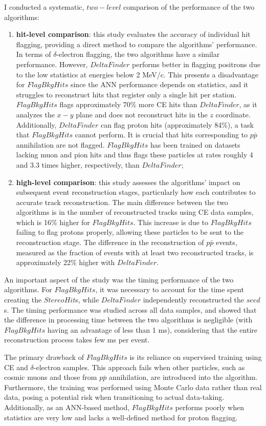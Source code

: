 I conducted a systematic, $two-level$ comparison of the performance 
of the two algorithms:
\begin{enumerate}
    \item \textbf{hit-level comparison}: this study evaluates the accuracy 
    of individual hit flagging, providing a direct method to compare 
    the algorithms' performance. In terms of $\delta$-electron flagging, 
    the two algorithms have a similar performance. However, 
    $DeltaFinder$ performs 
    better in flagging positrons due to the low statistics at energies 
    below 2 MeV/c. This presents a disadvantage for $FlagBkgHits$ since 
    the ANN performance depends on statistics, and it struggles 
    to reconstruct hits 
    that register only a single hit per station. $FlagBkgHits$ flags 
    approximately 70\% more CE hits than $DeltaFinder$, as it analyzes 
    the $x-y$ plane and does not reconstruct hits in the $z$ coordinate. 
    Additionally, $DeltaFinder$ 
    can flag proton hits (approximately 84\%), a task that $FlagBkgHits$ 
    cannot perform. 
    It is crucial that hits corresponding to $p\bar{p}$ annihilation 
    are not flagged. $FlagBkgHits$ has been trained on datasets lacking 
    muon and pion hits and thus flags these particles at rates roughly 
    4 and 3.3 times higher, respectively, than $DeltaFinder$;

\item  \textbf{high-level comparison}: this study 
assesses the algorithms' impact on 
subsequent event reconstruction stages, 
particularly how each contributes to accurate 
track reconstruction. The main difference 
between the two algorithms is in the number 
of reconstructed tracks using CE data samples, 
which is 16\% higher for $FlagBkgHits$. 
This increase is due to $FlagBkgHits$ failing to 
flag protons properly, allowing these 
particles to be sent to the reconstruction stage. 
The difference in the reconstruction of $p\bar{p}$ 
events, measured as the fraction of events with at 
least two reconstructed tracks, is approximately 
22\% higher with $DeltaFinder$.
\end{enumerate}

An important aspect of the study was the 
timing performance of the two algorithms. 
For $FlagBkgHits$, it was necessary to 
account for the time spent creating the $StereoHit$s, 
while $DeltaFinder$ independently reconstructed 
the $seed$s. The timing performance was 
studied across all data samples, and showed that 
the difference in processing time between 
the two algorithms is negligible (with 
$FlagBkgHits$ having an advantage of less than 1 ms), 
considering that the entire reconstruction 
process takes few ms per event.

The primary drawback of $FlagBkgHits$ is its 
reliance on supervised training using 
CE and $\delta$-electron samples. This 
approach fails when other particles, such 
as cosmic muons and those from $p\bar{p}$ 
annihilation, are introduced into the algorithm. 
Furthermore, the training was performed using 
Monte Carlo data rather than real data, 
posing a potential risk when transitioning 
to actual data-taking. Additionally, as an 
ANN-based method, $FlagBkgHits$ performs 
poorly when statistics are very low and lacks 
a well-defined method for proton flagging.
